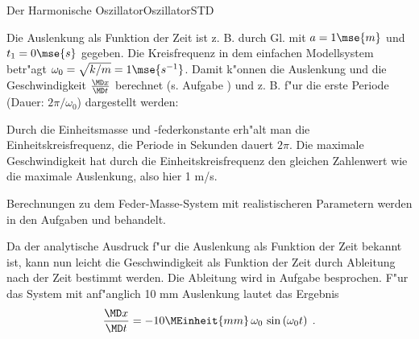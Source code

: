 \begin{MXContent}{Der Harmonische Oszillator}{Oszillator}{STD}
\begin{MExample}
\begin{center}
  \end{center}

Die Auslenkung als Funktion der Zeit ist z. B. durch Gl.  mit $a=1\mse{m}$ und $t_1 = 0\mse{s}$ gegeben. Die Kreisfrequenz in dem einfachen Modellsystem betr"agt $\omega_0=\sqrt{k/m}=1\mse{s^{-1}}$. Damit k"onnen die Auslenkung und die Geschwindigkeit $\frac{\MD x}{\MD t}$ berechnet (s. Aufgabe ) und z. B.
f"ur die erste Periode (Dauer: $2\pi/\omega_0$) dargestellt werden:

\begin{center}
  \end{center}

Durch die Einheitsmasse und -federkonstante erh"alt man die Einheitskreisfrequenz, die Periode in Sekunden dauert $2\pi$. Die maximale Geschwindigkeit hat durch die Einheitskreisfrequenz den gleichen Zahlenwert wie die maximale Auslenkung, also hier 1 m/s.

\end{MExample}

Berechnungen zu dem Feder-Masse-System mit realistischeren Parametern werden in den Aufgaben 
und
behandelt.

Da der analytische Ausdruck f"ur die Auslenkung als Funktion der Zeit bekannt ist, kann nun leicht die Geschwindigkeit als Funktion der Zeit durch Ableitung nach der Zeit bestimmt werden. Die Ableitung wird in Aufgabe  besprochen. F"ur das System mit anf"anglich 10 mm Auslenkung lautet das Ergebnis
\begin{equation}
  \frac{\MD x }{\MD t} = -10\MEinheit{mm}\,\omega_0\,\sin\left(\omega_0t\right)\; .
\end{equation}


\end{MXContent}
